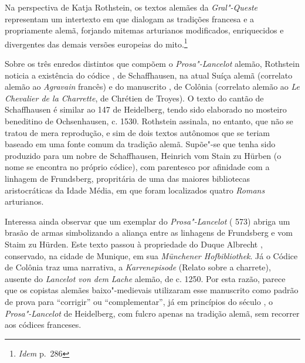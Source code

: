 Na perspectiva de Katja Rothstein, os textos alemães da \textit{Gral"-Queste}
representam um intertexto em que dialogam as tradições francesa e a propriamente
alemã, forjando mitemas arturianos modificados, enriquecidos e divergentes das
demais versões europeias do mito.\footnote{ \textit{Idem} p.~286}

Sobre os três enredos distintos que compõem o \textit{Prosa"-Lancelot} alemão,
Rothstein noticia a existência do códice , de Schaffhausen, na atual Suíça
alemã (correlato alemão ao \textit{Agravain} francês) e do manuscrito , de
Colônia (correlato alemão ao \textit{Le Chevalier de la Charrette}, de Chrétien
de Troyes). O texto do cantão de Schaffhausen é similar ao  147 de
Heidelberg, tendo sido elaborado no mosteiro beneditino de Ochsenhausen, c.
1530. Rothstein assinala, no entanto, que não se tratou de mera reprodução, e
sim de dois textos autônomos que se teriam baseado em uma fonte comum da
tradição alemã. Supõe"-se que tenha sido produzido para um nobre de Schaffhausen,
Heinrich vom Stain zu Hürben (o nome se encontra no próprio códice), 
com parentesco por afinidade com a linhagem de Frundsberg, propritária de uma
das maiores bibliotecas aristocráticas da Idade Média, em que foram localizados
quatro \textit{Romans} arturianos.

Interessa ainda observar que um exemplar do \textit{Prosa"-Lancelot} ( 573)
abriga um brasão de armas simbolizando a aliança entre as linhagens de
Frundsberg e vom Staim zu Hürden. Este texto passou à propriedade do Duque
Albrecht , conservado, na cidade de Munique, em sua \textit{Münchener
Hofbibliothek}. Já o Códice de Colônia traz uma narrativa, a
\textit{Karrenepisode} (Relato sobre a charrete), ausente do \textit{Lancelot
von dem Lache} alemão, de c. 1250. Por esta razão, parece que os copistas
alemães baixo"-medievais utilizaram esse manuscrito  como padrão de prova
para ``corrigir'' ou ``complementar'', já em princípios do século ,
o \textit{Prosa"-Lancelot} de Heidelberg, com fulcro apenas na tradição alemã,
sem recorrer aos códices franceses.


